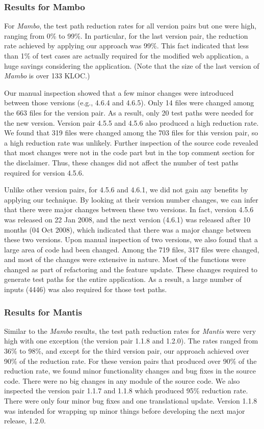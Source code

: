 \subsubsection{Results for Mambo}

For {\em Mambo}, the test path reduction rates for all version pairs
but one were high, ranging from 0\% to 99\%. In particular,
for the last version pair, the reduction rate achieved by applying
our approach was 99\%. This fact indicated that less than 1\%
of test cases are actually required for the modified web application,
a huge savings considering the application. (Note
that the size of the last version of {\em Mambo} is over 133 KLOC.)

Our manual inspection showed that a few minor changes were
introduced between those versions (e.g., 4.6.4 and 4.6.5). Only 14 files
were changed among the 663 files for the version pair. As a result, only
20 test paths were needed for the new version.
Version pair 4.5.5 and 4.5.6 also produced a high reduction rate.
We found that 319 files were changed among the 703 files for this version 
pair, so a high reduction rate was unlikely. Further inspection of 
the source code revealed that most changes were not in the code 
part but in the top comment section for the disclaimer. Thus, these changes
did not affect the number of test paths required for version 4.5.6. 

Unlike other version pairs, for 4.5.6 and 4.6.1, we did not gain any
benefits by applying our technique. By looking at their version number 
changes, we can infer that there were major changes between these 
two versions. In fact, version 4.5.6 was released on 22 Jan 2008, and 
the next version (4.6.1) was released after 10 months (04 Oct 2008), which
indicated that there was a major change between these two versions.
Upon manual inspection of two versions, we also found that a large 
area of code had been changed. Among the 719 files, 317 files were changed, 
and most of the changes were extensive in nature. Most of the functions 
were changed as part of refactoring and the feature update.
These changes required to generate test paths for the entire application.
As a result, a large number of inputs (4446) was also required for those 
test paths. 

\subsubsection{Results for Mantis}

Similar to the {\em Mambo} results, the test path reduction rates
for {\em Mantis} were very high with one exception (the version pair
1.1.8 and 1.2.0). The rates ranged from 36\% to 98\%, and except 
for the third version pair, our approach achieved over 90\% of 
the reduction rate. For these version pairs that produced over 90\% 
of the reduction rate, we found minor functionality changes and bug 
fixes in the source code. There were no big changes in any module of 
the source code. We also inspected the version pair 1.1.7 and 1.1.8
which produced 95\% reduction rate. There were only four minor bug 
fixes and one translational update.  Version 1.1.8 was intended for 
wrapping up minor things before developing the next major release, 1.2.0.

